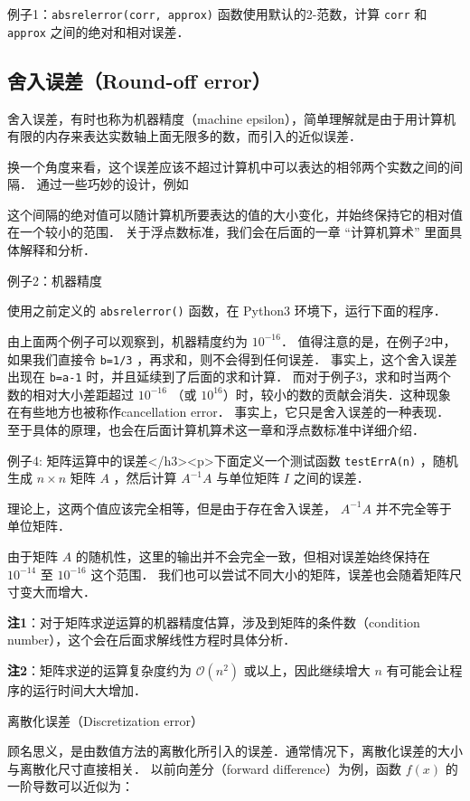 例子1：\verb|absrelerror(corr, approx)| 函数使用默认的2-范数，计算 \verb|corr| 和 \verb|approx| 之间的绝对和相对误差．


\subsection{舍入误差（Round-off error）}

舍入误差，有时也称为机器精度（machine epsilon），简单理解就是由于用计算机有限的内存来表达实数轴上面无限多的数，而引入的近似误差．

换一个角度来看，这个误差应该不超过计算机中可以表达的相邻两个实数之间的间隔． 通过一些巧妙的设计，例如

这个间隔的绝对值可以随计算机所要表达的值的大小变化，并始终保持它的相对值在一个较小的范围． 关于浮点数标准，我们会在后面的一章 “计算机算术” 里面具体解释和分析．

例子2：机器精度

使用之前定义的 \verb|absrelerror()| 函数，在 Python3 环境下，运行下面的程序．

由上面两个例子可以观察到，机器精度约为  $10^{-16}$． 值得注意的是，在例子2中， 如果我们直接令 \verb|b=1/3| ，再求和，则不会得到任何误差． 事实上，这个舍入误差出现在 \verb|b=a-1| 时，并且延续到了后面的求和计算． 而对于例子3，求和时当两个数的相对大小差距超过  $10^{-16}$  （或  $10^{16}$）时，较小的数的贡献会消失．这种现象在有些地方也被称作cancellation error． 事实上，它只是舍入误差的一种表现． 至于具体的原理，也会在后面计算机算术这一章和浮点数标准中详细介绍．

例子4: 矩阵运算中的误差</h3><p>下面定义一个测试函数 \verb|testErrA(n)| ，随机生成  $n\times n$  矩阵  $A$  ，然后计算  $A^{-1}A$  与单位矩阵  $I$  之间的误差．

理论上，这两个值应该完全相等，但是由于存在舍入误差， $A^{-1}A$ 并不完全等于单位矩阵．

由于矩阵  $A$  的随机性，这里的输出并不会完全一致，但相对误差始终保持在 $10^{-14}$  至  $10^{-16}$  这个范围． 我们也可以尝试不同大小的矩阵，误差也会随着矩阵尺寸变大而增大．

\textbf{注1}：对于矩阵求逆运算的机器精度估算，涉及到矩阵的条件数（condition number），这个会在后面求解线性方程时具体分析．

\textbf{注2}：矩阵求逆的运算复杂度约为  $\mathcal{O}(n^2)$  或以上，因此继续增大  $n$  有可能会让程序的运行时间大大增加．

离散化误差（Discretization error）

顾名思义，是由数值方法的离散化所引入的误差．通常情况下，离散化误差的大小与离散化尺寸直接相关． 以前向差分（forward difference）为例，函数  $f(x)$  的一阶导数可以近似为：

